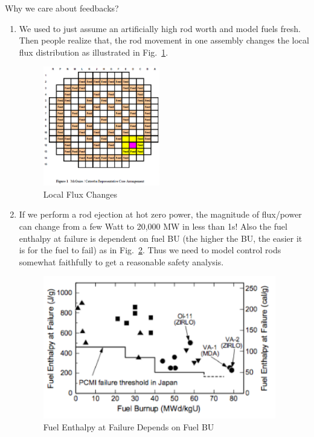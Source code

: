 \documentclass{school-22.211-notes}
\date{April 30, 2012}
\begin{document}
\maketitle

 \label{PKE-with-feedback}

Why we care about feedbacks? 
\begin{enumerate}
\item We used to just assume an artificially high rod worth and model fuels fresh. Then people realize that, the rod movement in one assembly changes the local flux distribution as illustrated in Fig.~\ref{local-flux-changes}. 
  \begin{figure}[ht]
    \centering
    \includegraphics[width=2in]{images/pke/local-flux-changes.png}
    \caption{Local Flux Changes} \label{local-flux-changes}
  \end{figure}

\item If we perform a rod ejection at hot zero power, the magnitude of flux/power can change from a few Watt to 20,000 MW in less than 1s! Also the fuel enthalpy at failure is dependent on fuel BU (the higher the BU, the easier it is for the fuel to fail) as in Fig.~\ref{failure-depend-on-BU}. Thus we need to model control rods somewhat faithfully to get a reasonable safety analysis. 
  \begin{figure}[ht]
    \centering
    \includegraphics[width=4in]{images/pke/failure-depend-on-BU.png}
    \caption{Fuel Enthalpy at Failure Depends on Fuel BU} \label{failure-depend-on-BU}
  \end{figure}


\end{enumerate}
\end{document}
